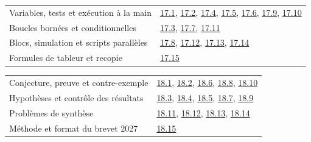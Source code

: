 \begin{tabularx}{\linewidth}{@{}Yl@{}}\toprule
Variables, tests et exécution à la main & \hyperref[exo-17-1]{17.1}, \hyperref[exo-17-2]{17.2}, \hyperref[exo-17-4]{17.4}, \hyperref[exo-17-5]{17.5}, \hyperref[exo-17-6]{17.6}, \hyperref[exo-17-9]{17.9}, \hyperref[exo-17-10]{17.10}\\[2mm]
Boucles bornées et conditionnelles & \hyperref[exo-17-3]{17.3}, \hyperref[exo-17-7]{17.7}, \hyperref[exo-17-11]{17.11}\\[2mm]
Blocs, simulation et scripts parallèles & \hyperref[exo-17-8]{17.8}, \hyperref[exo-17-12]{17.12}, \hyperref[exo-17-13]{17.13}, \hyperref[exo-17-14]{17.14}\\[2mm]
Formules de tableur et recopie & \hyperref[exo-17-15]{17.15}\\[2mm]
\bottomrule\end{tabularx}\par\vspace{4mm}
\begin{tabularx}{\linewidth}{@{}Yl@{}}\toprule
Conjecture, preuve et contre-exemple & \hyperref[exo-18-1]{18.1}, \hyperref[exo-18-2]{18.2}, \hyperref[exo-18-6]{18.6}, \hyperref[exo-18-8]{18.8}, \hyperref[exo-18-10]{18.10}\\[2mm]
Hypothèses et contrôle des résultats & \hyperref[exo-18-3]{18.3}, \hyperref[exo-18-4]{18.4}, \hyperref[exo-18-5]{18.5}, \hyperref[exo-18-7]{18.7}, \hyperref[exo-18-9]{18.9}\\[2mm]
Problèmes de synthèse & \hyperref[exo-18-11]{18.11}, \hyperref[exo-18-12]{18.12}, \hyperref[exo-18-13]{18.13}, \hyperref[exo-18-14]{18.14}\\[2mm]
Méthode et format du brevet 2027 & \hyperref[exo-18-15]{18.15}\\[2mm]
\bottomrule\end{tabularx}\par\vspace{4mm}
\clearpage
